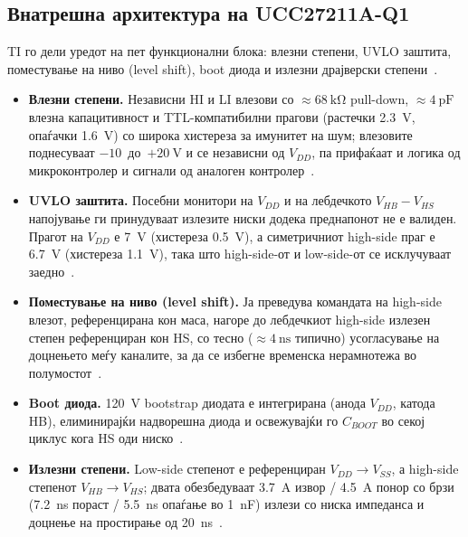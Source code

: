 \documentclass[journal,onecolumn,11pt]{IEEEtran}
\begin{document}
\subsection{Внатрешна архитектура на UCC27211A-Q1}
TI го дели уредот на пет функционални блока: влезни степени, UVLO заштита,
поместување на ниво (level shift), boot диода и излезни драјверски степени~\cite{ucc27211}.
\begin{itemize}[leftmargin=1.3em]
  \item \textbf{Влезни степени.} Независни HI и LI влезови со $\approx\SI{68}{\kilo\ohm}$
        pull-down, $\approx\SI{4}{\pico\farad}$ влезна капацитивност и
        TTL-компатибилни прагови (растечки \SI{2.3}{\volt}, опаѓачки \SI{1.6}{\volt})
        со широка хистереза за имунитет на шум; влезовите поднесуваат
        \mbox{$-10$ до $+\SI{20}{\volt}$} и се независни од $V_{DD}$, па прифаќаат и
        логика од микроконтролер и сигнали од аналоген контролер~\cite{ucc27211}.
  \item \textbf{UVLO заштита.} Посебни монитори на $V_{DD}$ и на лебдечкото
        $V_{HB}-V_{HS}$ напојување ги принудуваат излезите ниски додека преднапонот
        не е валиден. Прагот на $V_{DD}$ е \SI{7}{\volt} (хистереза \SI{0.5}{\volt}),
        а симетричниот high-side праг е \SI{6.7}{\volt} (хистереза \SI{1.1}{\volt}),
        така што high-side-от и low-side-от се исклучуваат заедно~\cite{ucc27211}.
  \item \textbf{Поместување на ниво (level shift).} Ја преведува командата на
        high-side влезот, референцирана кон маса, нагоре до лебдечкиот high-side
        излезен степен референциран кон HS, со тесно ($\approx\SI{4}{\nano\second}$
        типично) усогласување на доцнењето меѓу каналите, за да се избегне временска
        нерамнотежа во полумостот~\cite{ucc27211}.
  \item \textbf{Boot диода.} \SI{120}{\volt} bootstrap диодата е интегрирана (анода
        $V_{DD}$, катода HB), елиминирајќи надворешна диода и освежувајќи го
        $C_{BOOT}$ во секој циклус кога HS оди ниско~\cite{ucc27211}.
  \item \textbf{Излезни степени.} Low-side степенот е референциран
        $V_{DD}\rightarrow V_{SS}$, а high-side степенот $V_{HB}\rightarrow V_{HS}$;
        двата обезбедуваат \SI{3.7}{\ampere} извор / \SI{4.5}{\ampere} понор со брзи
        (\SI{7.2}{\nano\second} пораст / \SI{5.5}{\nano\second} опаѓање во
        \SI{1}{\nano\farad}) излези со ниска импеданса и доцнење на простирање од
        \SI{20}{\nano\second}~\cite{ucc27211}.
\end{itemize}
\end{document}
